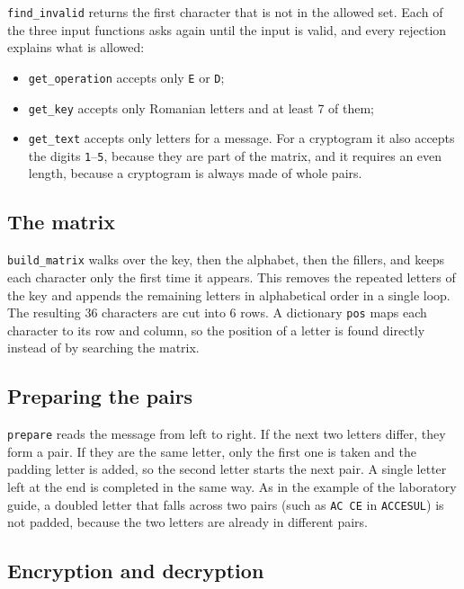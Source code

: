 \documentclass[12pt,a4paper]{article}
\begin{document}
\texttt{find\_invalid} returns the first character that is not in the allowed set. Each of the three input functions asks again until the input is valid, and every rejection explains what is allowed:
\begin{itemize}
  \item \texttt{get\_operation} accepts only \texttt{E} or \texttt{D};
  \item \texttt{get\_key} accepts only Romanian letters and at least 7 of them;
  \item \texttt{get\_text} accepts only letters for a message. For a cryptogram it also accepts the digits \texttt{1}--\texttt{5}, because they are part of the matrix, and it requires an even length, because a cryptogram is always made of whole pairs.
\end{itemize}

\subsection{The matrix}

\texttt{build\_matrix} walks over the key, then the alphabet, then the fillers, and keeps each character only the first time it appears. This removes the repeated letters of the key and appends the remaining letters in alphabetical order in a single loop. The resulting 36 characters are cut into 6 rows. A dictionary \texttt{pos} maps each character to its row and column, so the position of a letter is found directly instead of by searching the matrix.

\subsection{Preparing the pairs}

\texttt{prepare} reads the message from left to right. If the next two letters differ, they form a pair. If they are the same letter, only the first one is taken and the padding letter is added, so the second letter starts the next pair. A single letter left at the end is completed in the same way. As in the example of the laboratory guide, a doubled letter that falls across two pairs (such as \texttt{AC CE} in \texttt{ACCESUL}) is not padded, because the two letters are already in different pairs.

\subsection{Encryption and decryption}
\end{document}
